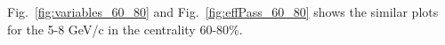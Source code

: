 Fig.~\ref{fig:variables_60_80} and Fig.~\ref{fig:effPass_60_80} shows the similar plots for the 5-8 GeV/c in the centrality 60-80\%.



